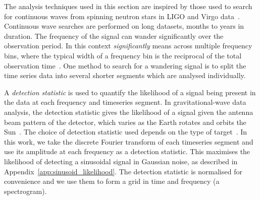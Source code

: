 \documentclass[paper-main.tex]{subfiles}
\begin{document}
The analysis techniques used in this section are inspired by those used to search for continuous waves from spinning neutron stars in LIGO and Virgo data~\cite{SuvorovaEtAl:2016,SuvorovaEtAl:2017}. 
Continuous wave searches are performed on long datasets, months to years in duration. 
The frequency of the signal can wander significantly over the observation period. 
In this context \emph{significantly} means across multiple frequency bins, where the typical width of a frequency bin is the reciprocal of the total observation time~\cite{JKS:1998,ScoX1O2Viterbi:2019}.
One method to search for a wandering signal is to split the time series data into several shorter segments which are analysed individually.%

A \emph{detection statistic} is used to quantify the likelihood of a signal being present in the data at each frequency and timeseries segment. 
In gravitational-wave data analysis, the detection statistic gives the likelihood of a signal given the antenna beam pattern of the detector, which varies as the Earth rotates and orbits the Sun~\cite{JKS:1998}. 
The choice of detection statistic used depends on the type of target~\cite{JKS:1998,SuvorovaEtAl:2017}.
In this work, we take the discrete Fourier transform of each timeseries segment and use its amplitude at each frequency as a detection statistic.
This maximises the likelihood of detecting a sinusoidal signal in Gaussian noise, as described in Appendix~\ref{app:sinusoid_likelihood}. 
The detection statistic is normalised for convenience and we use them to form a grid in  time and frequency (a spectrogram). 
\end{document}
